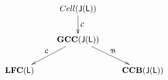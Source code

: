 \[
\xymatrixrowsep{0.3in}
\xymatrixcolsep{0.3in}
\xymatrix{
& & Cell(\sJ(\sL)) \ar[d]^{\cC} & &  \\
& & {\bf GCC}(\sJ(\sL)) \ar[dl]_{\mathfrak{L}} \ar[dr]^{\mathfrak{B}} & &  \\
&\bCF(\sL)  & &  {\bf CCB(\sJ(\sL))}&
}
\]


%
%



%











